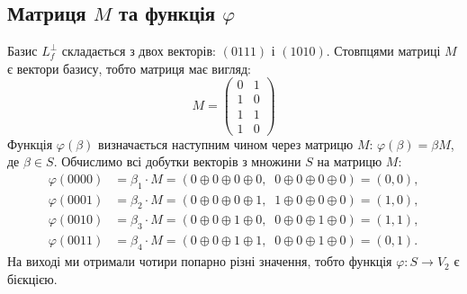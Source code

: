 \subsection{Матриця \texorpdfstring{$M$}{M} та функція \texorpdfstring{$\varphi$}{phi}}
Базис $L_{f}^{\perp}$ складається з двох векторів: $(0111)$ і $(1010)$. Стовпцями матриці $M$ є вектори базису, 
тобто матриця має вигляд:
\begin{equation}
    \label{eq:Mmatrix}
    M = \begin{pmatrix}
        0 & 1 \\
        1 & 0 \\
        1 & 1 \\
        1 & 0
    \end{pmatrix}
\end{equation}
Функція $\varphi(\beta)$ визначається наступним чином через матрицю $M$: $\varphi(\beta) = \beta M$, де $\beta \in S$. 
Обчислимо всі добутки векторів з множини $S$ на матрицю $M$:
\begin{align*}
    \varphi(0000) & = \beta_{1} \cdot M = (0 \oplus 0 \oplus 0 \oplus 0,\;\; 0 \oplus 0 \oplus 0 \oplus 0) = (0, 0), \\
    \varphi(0001) & = \beta_{2} \cdot M = (0 \oplus 0 \oplus 0 \oplus 1,\;\; 1 \oplus 0 \oplus 0 \oplus 0) = (1, 0), \\[2pt]
    \varphi(0010) & = \beta_{3} \cdot M = (0 \oplus 0 \oplus 1 \oplus 0,\;\; 0 \oplus 0 \oplus 1 \oplus 0) = (1, 1), \\[2pt]
    \varphi(0011) & = \beta_{4} \cdot M = (0 \oplus 0 \oplus 1 \oplus 1,\;\; 0 \oplus 0 \oplus 1 \oplus 0) = (0, 1).
\end{align*}
На виході ми отримали чотири попарно різні значення, тобто функція $\varphi\colon S \to V_{2}$ є бієкцією.

